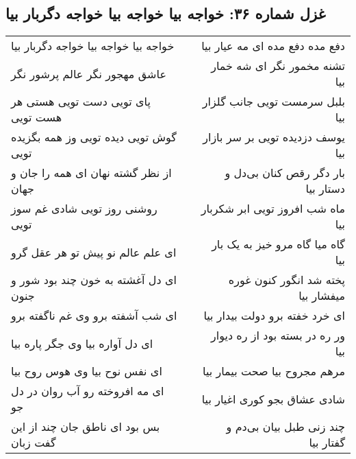\begin{center}
\section*{غزل شماره ۳۶: خواجه بیا خواجه بیا خواجه دگربار بیا}
\label{sec:0036}
\begin{longtable}{l p{0.5cm} r}
خواجه بیا خواجه بیا خواجه دگربار بیا
&&
دفع مده دفع مده ای مه عیار بیا
\\
عاشق مهجور نگر عالم پرشور نگر
&&
تشنه مخمور نگر ای شه خمار بیا
\\
پای تویی دست تویی هستی هر هست تویی
&&
بلبل سرمست تویی جانب گلزار بیا
\\
گوش تویی دیده تویی وز همه بگزیده تویی
&&
یوسف دزدیده تویی بر سر بازار بیا
\\
از نظر گشته نهان ای همه را جان و جهان
&&
بار دگر رقص کنان بی‌دل و دستار بیا
\\
روشنی روز تویی شادی غم سوز تویی
&&
ماه شب افروز تویی ابر شکربار بیا
\\
ای علم عالم نو پیش تو هر عقل گرو
&&
گاه میا گاه مرو خیز به یک بار بیا
\\
ای دل آغشته به خون چند بود شور و جنون
&&
پخته شد انگور کنون غوره میفشار بیا
\\
ای شب آشفته برو وی غم ناگفته برو
&&
ای خرد خفته برو دولت بیدار بیا
\\
ای دل آواره بیا وی جگر پاره بیا
&&
ور ره در بسته بود از ره دیوار بیا
\\
ای نفس نوح بیا وی هوس روح بیا
&&
مرهم مجروح بیا صحت بیمار بیا
\\
ای مه افروخته رو آب روان در دل جو
&&
شادی عشاق بجو کوری اغیار بیا
\\
بس بود ای ناطق جان چند از این گفت زبان
&&
چند زنی طبل بیان بی‌دم و گفتار بیا
\\
\end{longtable}
\end{center}
